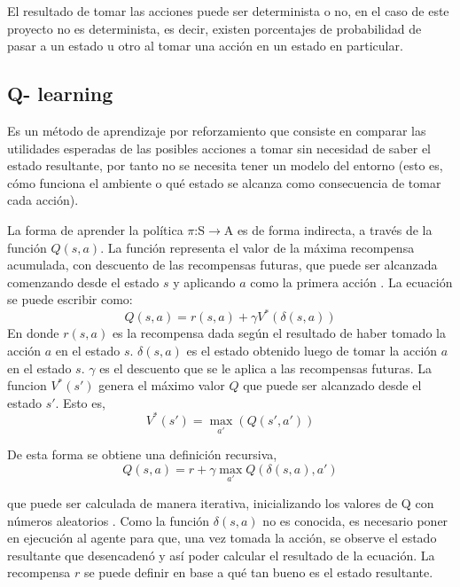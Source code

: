 El resultado de tomar las acciones puede ser determinista o no, en el caso de este proyecto no es determinista, es decir, existen porcentajes de probabilidad de pasar a un estado u otro al tomar una acción en un estado en particular.
  
\subsection{Q- learning}\label{subsec:Qlearning}

Es un método de aprendizaje por reforzamiento que consiste en comparar las utilidades esperadas de las posibles acciones a tomar sin necesidad de saber el estado resultante, por tanto no se necesita tener un modelo del entorno \cite{peterNorvig} (esto es, cómo funciona el ambiente o qu\'e estado se alcanza como consecuencia de tomar cada acción).

La forma de aprender la política $\pi$:S$\to$A es de forma indirecta, a través de la función $Q(s,a)$. La función representa el valor de la máxima recompensa acumulada, con descuento de las recompensas futuras, que puede ser alcanzada comenzando desde el estado $s$ y aplicando $a$ como la primera acción \cite{Mitchell}. La ecuación se puede escribir como:
\[Q(s,a) = r(s,a) + \gamma V^*(\delta(s,a))\]
En donde $r(s,a)$ es la recompensa dada según el resultado de haber tomado la acción $a$ en el estado $s$. $\delta(s,a)$ es el estado obtenido luego de tomar la acción $a$ en el estado $s$. $\gamma$ es el descuento que se le aplica a las recompensas futuras. La funcion $V^*(s')$ genera el máximo valor $Q$ que puede ser alcanzado desde el estado $s'$. Esto es,
\[V^*(s')= \max_{a'} (Q(s',a'))\] 

De esta forma se obtiene una definición recursiva,
\[Q(s,a) = r + \gamma \max_{a'} Q(\delta(s,a),a')\]

\noindent
que puede ser calculada de manera iterativa, inicializando los valores de Q con números aleatorios \cite{Mitchell}. Como la función $\delta(s,a)$ no es conocida, es necesario poner en ejecución al agente para que, una vez tomada la acción, se observe el estado resultante que desencadenó y así poder calcular el resultado de la ecuación. La recompensa $r$ se puede definir en base  a qu\'e tan bueno es el estado resultante. 


